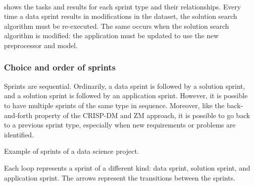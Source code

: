 \paragraph{}
 shows the tasks and results for each sprint type and their
relationships.  Every time a data sprint results in modifications in the dataset, the
solution search algorithm must be re-executed.  The same occurs when the solution search
algorithm is modified: the application must be updated to use the new \gls{preprocessor}
and model.

\subsubsection{Choice and order of sprints}

Sprints are sequential.  Ordinarily, a data sprint is followed by a solution sprint, and a
solution sprint is followed by an application sprint.  However, it is possible to have
multiple sprints of the same type in sequence.  Moreover, like the back-and-forth property of the CRISP-DM
and ZM approach, it is possible to go back to a previous sprint type, especially
when new requirements or problems are identified.

\begin{figurebox}[label=fig:sprints]{Example of sprints of a data science project.}
  \centering
  \tcblower
  Each loop represents a sprint of a different kind: data sprint, solution sprint, and
  application sprint.  The arrows represent the transitions between the sprints.
\end{figurebox}

